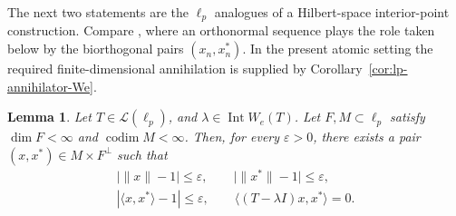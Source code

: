 \documentclass[11pt]{amsart}
\numberwithin{equation}{section}
\newtheorem{lemma}[theorem]{Lemma}
\theoremstyle{definition}
\theoremstyle{remark}
\DeclareMathOperator{\codim}{codim}
\DeclareMathOperator{\Int}{Int}
\newcommand{\ip}[2]{\langle #1,#2\rangle}
\newcommand{\e}{\varepsilon}
\newcommand{\We}{W_e}
\begin{document}
The next two statements are the $\ell_p$ analogues of a Hilbert-space interior-point construction.  Compare \cite[Corollary~4.3]{MT-circles}, where an orthonormal sequence plays the role taken below by the biorthogonal pairs $(x_n,x_n^*)$.  In the present atomic setting the required finite-dimensional annihilation is supplied by Corollary~\ref{cor:lp-annihilator-We}.

\begin{lemma}\label{lem:interior-We-finite-codim}
Let $T\in \mathcal L(\ell_p)$, and $\lambda\in \Int \We(T)$. Let $F,M\subset \ell_p$ satisfy $\dim F<\infty$ and $\codim M<\infty$. Then, for every $\e>0$, there exists a pair $(x,x^*)\in M\times F^\perp$ such that
\[
\begin{gathered}
\bigl|\|x\|-1\bigr|\le \e,
\qquad
\bigl|\|x^*\|-1\bigr|\le \e,\\
|\ip{x}{x^*}-1|\le \e,
\qquad
\ip{(T-\lambda I)x}{x^*}=0.
\end{gathered}
\]
\end{lemma}
\end{document}
